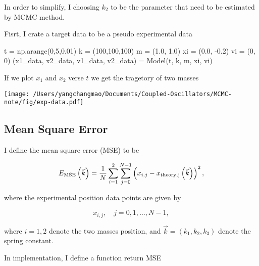 \documentclass[
]{article}
\newenvironment{Shaded}{}{}
\newcommand{\DecValTok}[1]{\textcolor[rgb]{0.25,0.63,0.44}{#1}}
\newcommand{\FloatTok}[1]{\textcolor[rgb]{0.25,0.63,0.44}{#1}}
\newcommand{\NormalTok}[1]{#1}
\newcommand{\OperatorTok}[1]{\textcolor[rgb]{0.40,0.40,0.40}{#1}}
\begin{document}
In order to simplify, I choosing \(k_2\) to be the parameter that need
to be estimated by MCMC method.

Fisrt, I crate a target data to be a pseudo experimental data

\begin{Shaded}
\begin{Highlighting}[]
\NormalTok{t }\OperatorTok{=}\NormalTok{ np.arange(}\DecValTok{0}\NormalTok{,}\DecValTok{5}\NormalTok{,}\FloatTok{0.01}\NormalTok{)}
\NormalTok{k }\OperatorTok{=}\NormalTok{ (}\DecValTok{100}\NormalTok{,}\DecValTok{100}\NormalTok{,}\DecValTok{100}\NormalTok{)}
\NormalTok{m }\OperatorTok{=}\NormalTok{ (}\FloatTok{1.0}\NormalTok{, }\FloatTok{1.0}\NormalTok{)}
\NormalTok{xi }\OperatorTok{=}\NormalTok{ (}\FloatTok{0.0}\NormalTok{, }\OperatorTok{{-}}\FloatTok{0.2}\NormalTok{)}
\NormalTok{vi }\OperatorTok{=}\NormalTok{ (}\DecValTok{0}\NormalTok{, }\DecValTok{0}\NormalTok{)}
\NormalTok{(x1\_data, x2\_data, v1\_data, v2\_data) }\OperatorTok{=}\NormalTok{ Model(t, k, m, xi, vi)}
\end{Highlighting}
\end{Shaded}

If we plot \(x_1\) and \(x_2\) verse \(t\) we get the tragetory of two
masses

\texttt{[image: /Users/yangchangmao/Documents/Coupled-Oscillators/MCMC-note/fig/exp-data.pdf]}


\newpage
\hypertarget{mean-square-error}{%
\subsection{Mean Square Error}\label{mean-square-error}}

I define the mean square error (MSE) to be

\[E_{\rm MSE}\left(\vec{k}\right) = \frac{1}{N}\sum_{i=1}^{2}\sum_{j=0}^{N-1}\left(x_{i,j}-x_{\rm theory,j}\left(\vec{k}\right)\right)^2,\]

where the experimental position data points are given by

\[x_{i,j},\quad j=0,1,\ldots, N-1,\]

where \(i=1,2\) denote the two masses position, and
\(\vec{k}=\left(k_1,k_2,k_3\right)\) denote the spring constant.

In implementation, I define a function return MSE
\end{document}
